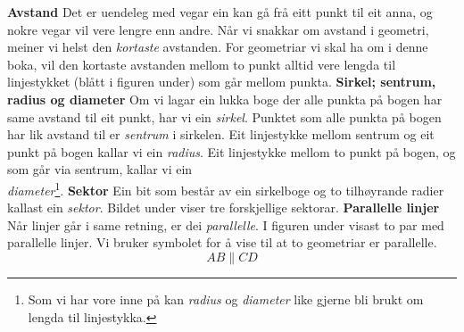 \newpage
{}
\newpage
\textbf{Avstand}\os
Det er uendeleg med vegar ein kan gå frå eitt punkt til eit anna, og nokre vegar vil vere lengre enn andre. Når vi snakkar om avstand i geometri, meiner vi helst den \textsl{kortaste} avstanden. For geometriar vi skal ha om i denne boka, vil den kortaste avstanden mellom to punkt alltid vere lengda til linjestykket (blått i figuren under) som går mellom punkta.
\textbf{Sirkel; sentrum, radius og diameter} \os
Om vi lagar ein lukka boge der alle punkta på bogen har same avstand til eit punkt, har vi ein \textit{sirkel}. Punktet som alle punkta på bogen har lik avstand til er \textit{sentrum} i sirkelen. Eit linjestykke mellom sentrum og eit punkt på bogen kallar vi ein \textit{radius}. Eit linjestykke mellom to punkt på bogen, og som går via sentrum, kallar vi ein\\ \textit{diameter}\footnote{Som vi har vore inne på kan \textit{radius} og \textit{diameter} like gjerne bli brukt om lengda til linjestykka.}.
\textbf{Sektor} \os
Ein bit som består av ein sirkelboge og to tilhøyrande radier kallast ein \textit{sektor}. Bildet under viser tre forskjellige sektorar.
\newpage
\textbf{Parallelle linjer}\os
Når linjer går i same retning, er dei \textit{parallelle}. I figuren under visast to par med parallelle linjer.
Vi bruker symbolet \sym{$ \parallel $} for å vise til at to geometriar er parallelle.
\[ AB\parallel CD \]

